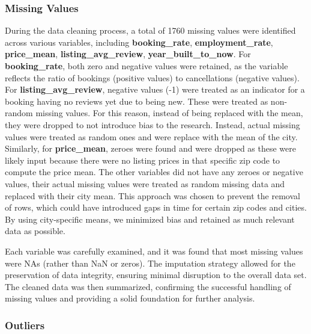 \documentclass[
  12pt,
]{article}
\begin{document}
\subsubsection{Missing Values}\label{missing-values}

During the data cleaning process, a total of 1760 missing values were
identified across various variables, including \textbf{booking\_rate},
\textbf{employment\_rate}, \textbf{price\_mean},
\textbf{listing\_avg\_review}, \textbf{year\_built\_to\_now}. For
\textbf{booking\_rate}, both zero and negative values were retained, as
the variable reflects the ratio of bookings (positive values) to
cancellations (negative values). For \textbf{listing\_avg\_review},
negative values (-1) were treated as an indicator for a booking having
no reviews yet due to being new. These were treated as non-random
missing values. For this reason, instead of being replaced with the
mean, they were dropped to not introduce bias to the research. Instead,
actual missing values were treated as random ones and were replace with
the mean of the city. Similarly, for \textbf{price\_mean}, zeroes were
found and were dropped as these were likely input because there were no
listing prices in that specific zip code to compute the price mean. The
other variables did not have any zeroes or negative values, their actual
missing values were treated as random missing data and replaced with
their city mean. This approach was chosen to prevent the removal of
rows, which could have introduced gaps in time for certain zip codes and
cities. By using city-specific means, we minimized bias and retained as
much relevant data as possible.

Each variable was carefully examined, and it was found that most missing
values were NAs (rather than NaN or zeros). The imputation strategy
allowed for the preservation of data integrity, ensuring minimal
disruption to the overall data set. The cleaned data was then
summarized, confirming the successful handling of missing values and
providing a solid foundation for further analysis.

\subsubsection{Outliers}\label{outliers}
\end{document}
